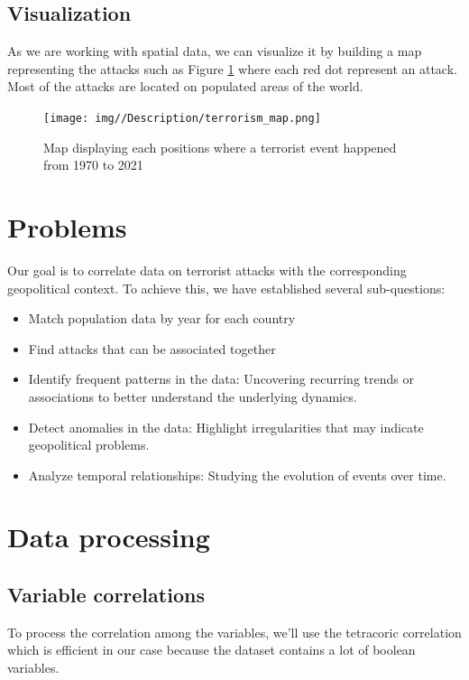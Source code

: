 \documentclass{article}
\begin{document}
\subsection{Visualization}

As we are working with spatial data, we can visualize it by building a map representing the attacks such as Figure \ref{fig:terrorism-map} where each red dot represent an attack. Most of the attacks are located on populated areas of the world.

\begin{figure}[!htb]
    \centering
    \texttt{[image: img//Description/terrorism\_map.png]}
    \caption{Map displaying each positions where a terrorist event happened from 1970 to 2021}
    \label{fig:terrorism-map}
\end{figure}

\section{Problems}

Our goal is to correlate data on terrorist attacks with the corresponding geopolitical context. To achieve this, we have established several sub-questions:
\begin{itemize}
    \item Match population data by year for each country
    \item Find attacks that can be associated together
    \item Identify frequent patterns in the data: Uncovering recurring trends or associations to better understand the underlying dynamics.
    \item Detect anomalies in the data: Highlight irregularities that may indicate geopolitical problems.
    \item Analyze temporal relationships: Studying the evolution of events over time.
\end{itemize}

\section{Data processing}

\subsection{Variable correlations}

To process the correlation among the variables, we'll use the tetracoric correlation which is efficient in our case because the dataset contains a lot of boolean variables.
\end{document}
